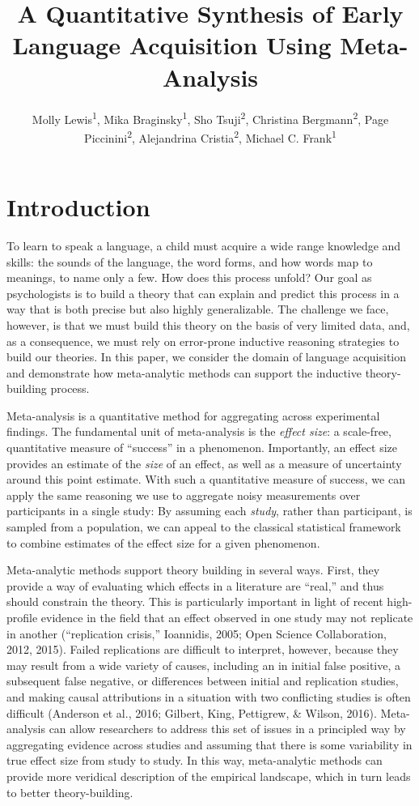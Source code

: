 \documentclass[english,floatsintext,man]{apa6}
\title{A Quantitative Synthesis of Early Language Acquisition Using
Meta-Analysis}
\author{
          Molly Lewis\textsuperscript{1},
          Mika Braginsky\textsuperscript{1},
          Sho Tsuji\textsuperscript{2},
          Christina Bergmann\textsuperscript{2},
          Page Piccinini\textsuperscript{2},
          Alejandrina Cristia\textsuperscript{2},
          Michael C. Frank\textsuperscript{1}  }
\affiliation{
    \vspace{0.5cm}
          \textsuperscript{1} Department Psychology, Stanford University\\
          \textsuperscript{2} Laboratoire de Sciences Cognitives et Psycholinguistique, ENS  }
\begin{document}
\maketitle



\section{Introduction}\label{introduction}

To learn to speak a language, a child must acquire a wide range
knowledge and skills: the sounds of the language, the word forms, and
how words map to meanings, to name only a few. How does this process
unfold? Our goal as psychologists is to build a theory that can explain
and predict this process in a way that is both precise but also highly
generalizable. The challenge we face, however, is that we must build
this theory on the basis of very limited data, and, as a consequence, we
must rely on error-prone inductive reasoning strategies to build our
theories. In this paper, we consider the domain of language acquisition
and demonstrate how meta-analytic methods can support the inductive
theory-building process.

Meta-analysis is a quantitative method for aggregating across
experimental findings. The fundamental unit of meta-analysis is the
\emph{effect size}: a scale-free, quantitative measure of
\enquote{success} in a phenomenon. Importantly, an effect size provides
an estimate of the \emph{size} of an effect, as well as a measure of
uncertainty around this point estimate. With such a quantitative measure
of success, we can apply the same reasoning we use to aggregate noisy
measurements over participants in a single study: By assuming each
\emph{study}, rather than participant, is sampled from a population, we
can appeal to the classical statistical framework to combine estimates
of the effect size for a given phenomenon.

Meta-analytic methods support theory building in several ways. First,
they provide a way of evaluating which effects in a literature are
\enquote{real,} and thus should constrain the theory. This is
particularly important in light of recent high-profile evidence in the
field that an effect observed in one study may not replicate in another
(``replication crisis,'' Ioannidis, 2005; Open Science Collaboration,
2012, 2015). Failed replications are difficult to interpret, however,
because they may result from a wide variety of causes, including an in
initial false positive, a subsequent false negative, or differences
between initial and replication studies, and making causal attributions
in a situation with two conflicting studies is often difficult (Anderson
et al., 2016; Gilbert, King, Pettigrew, \& Wilson, 2016). Meta-analysis
can allow researchers to address this set of issues in a principled way
by aggregating evidence across studies and assuming that there is some
variability in true effect size from study to study. In this way,
meta-analytic methods can provide more veridical description of the
empirical landscape, which in turn leads to better theory-building.
\end{document}
